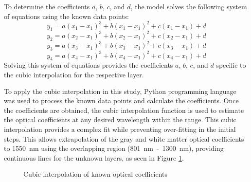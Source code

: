 \documentclass[journal,twoside,web]{ieeecolor}
\begin{document}
To determine the coefficients $a$, $b$, $c$, and $d$, the model solves the following system of equations using the known data points:
\begin{equation}
    \label{eq:cubicEq2}
    y_1 = a(x_1-x_1)^3 + b(x_1-x_1)^2 + c(x_1-x_1) + d 
\end{equation}
\begin{equation}
    \label{eq:cubicEq3}
    y_2 = a(x_2-x_1)^3 + b(x_2-x_1)^2 + c(x_2-x_1) + d 
\end{equation}
\begin{equation}
    \label{eq:cubicEq4}
    y_3 = a(x_3-x_1)^3 + b(x_3-x_1)^2 + c(x_3-x_1) + d 
\end{equation}
\begin{equation}
    \label{eq:cubicEq5}
    y_4 = a(x_4-x_1)^3 + b(x_4-x_1)^2 + c(x_4-x_1) + d 
\end{equation}
Solving this system of equations provides the coefficients $a$, $b$, $c$, and $d$ specific to the cubic interpolation for the respective layer.

To apply the cubic interpolation in this study, Python programming language was used to process the known data points and calculate the coefficients. 
Once the coefficients are obtained, the cubic interpolation function is used to estimate the optical coefficients at any desired wavelength within the range. 
This cubic interpolation provides a complex fit while preventing over-fitting in the initial steps. This allows extrapolation of the gray and white matter 
optical coefficients to 1550~nm using the overlapping region (801~nm~-~1300~nm), providing continuous lines for the unknown layers, as seen in Figure \ref{fig:Known}.

\begin{figure}[!htb]
    \caption{\label{fig:Known} Cubic interpolation of known optical coefficients}
\end{figure}
\end{document}
